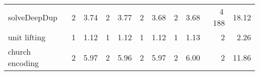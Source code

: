 \begin{tabular}{lrrrrrrrrrr}
\textsf{solveDeepDup}& {\def\@currentlabel{2}\label{stats:SolveDeepDup:Unshared:mem}2} & {\def\@currentlabel{3.74}\label{stats:SolveDeepDup:Unshared:time}3.74}& {\def\@currentlabel{2}\label{stats:SolveDeepDup:Shared:mem}2} & {\def\@currentlabel{3.77}\label{stats:SolveDeepDup:Shared:time}3.77}& {\def\@currentlabel{2}\label{stats:SolveDeepDup:SharedThunk:mem}2} & {\def\@currentlabel{3.68}\label{stats:SolveDeepDup:SharedThunk:time}3.68}& {\def\@currentlabel{2}\label{stats:SolveDeepDup:SharedEvaled:mem}2} & {\def\@currentlabel{3.68}\label{stats:SolveDeepDup:SharedEvaled:time}3.68}& {\def\@currentlabel{4\,188}\label{stats:SolveDeepDup:SharedFull:mem}4\,188} & {\def\@currentlabel{18.12}\label{stats:SolveDeepDup:SharedFull:time}18.12} \\
unit lifting& {\def\@currentlabel{1}\label{stats:Unit:Unshared:mem}1} & {\def\@currentlabel{1.12}\label{stats:Unit:Unshared:time}1.12}& {\def\@currentlabel{1}\label{stats:Unit:Shared:mem}1} & {\def\@currentlabel{1.12}\label{stats:Unit:Shared:time}1.12}& {\def\@currentlabel{1}\label{stats:Unit:SharedThunk:mem}1} & {\def\@currentlabel{1.12}\label{stats:Unit:SharedThunk:time}1.12}& {\def\@currentlabel{1}\label{stats:Unit:SharedEvaled:mem}1} & {\def\@currentlabel{1.13}\label{stats:Unit:SharedEvaled:time}1.13}& {\def\@currentlabel{2}\label{stats:Unit:SharedFull:mem}2} & {\def\@currentlabel{2.26}\label{stats:Unit:SharedFull:time}2.26} \\
church encoding& {\def\@currentlabel{2}\label{stats:Church:Unshared:mem}2} & {\def\@currentlabel{5.97}\label{stats:Church:Unshared:time}5.97}& {\def\@currentlabel{2}\label{stats:Church:Shared:mem}2} & {\def\@currentlabel{5.96}\label{stats:Church:Shared:time}5.96}& {\def\@currentlabel{2}\label{stats:Church:SharedThunk:mem}2} & {\def\@currentlabel{5.97}\label{stats:Church:SharedThunk:time}5.97}& {\def\@currentlabel{2}\label{stats:Church:SharedEvaled:mem}2} & {\def\@currentlabel{6.00}\label{stats:Church:SharedEvaled:time}6.00}& {\def\@currentlabel{2}\label{stats:Church:SharedFull:mem}2} & {\def\@currentlabel{11.86}\label{stats:Church:SharedFull:time}11.86} \\
\end{tabular}
\makeatother
